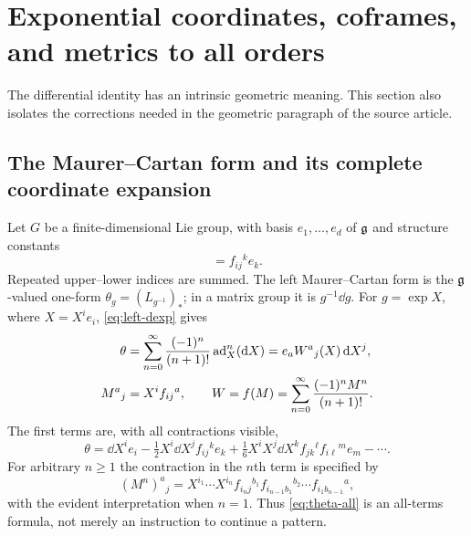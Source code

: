 \section{Exponential coordinates, coframes, and metrics to all orders}\label{sec:geometry}
The differential identity has an intrinsic geometric meaning. This section also isolates the corrections needed in the geometric paragraph of the source article.

\subsection{The Maurer--Cartan form and its complete coordinate expansion}
Let $G$ be a finite-dimensional Lie group, with basis $e_1,\ldots,e_d$ of $\mathfrak g$ and structure constants
\begin{equation}
 [e_i,e_j]=f_{ij}{}^k e_k.
\end{equation}
Repeated upper--lower indices are summed. The left Maurer--Cartan form is the $\mathfrak g$-valued one-form $\theta_g=(L_{g^{-1}})_*$; in a matrix group it is $g^{-1}\dd g$. For $g=\exp X$, where $X=X^i e_i$, \cref{eq:left-dexp} gives
\begin{align}
 \theta&=\sum_{n=0}^{\infty}\frac{(-1)^n}{(n+1)!}\operatorname{ad}_X^n(\mathrm d X)
       =e_a W^a{}_j(X)\,\mathrm d X^j,\label{eq:theta-all}\\
 M^a{}_j&=X^i f_{ij}{}^a,\qquad
 W=f(M)=\sum_{n=0}^{\infty}\frac{(-1)^nM^n}{(n+1)!}.
 \label{eq:W-all}
\end{align}
The first terms are, with all contractions visible,
\begin{equation}\label{eq:theta-first}
 \theta=\dd X^i e_i
 -\tfrac12 X^i\dd X^j f_{ij}{}^k e_k
 +\tfrac16 X^iX^j\dd X^k f_{jk}{}^\ell f_{i\ell}{}^m e_m
 -\cdots.
\end{equation}
For arbitrary $n\geq1$ the contraction in the $n$th term is specified by
\begin{equation}
 (M^n)^a{}_j=
 X^{i_1}\cdots X^{i_n}
 f_{i_nj}{}^{b_1}f_{i_{n-1}b_1}{}^{b_2}\cdots
 f_{i_1b_{n-1}}{}^a,
\end{equation}
with the evident interpretation when $n=1$. Thus \cref{eq:theta-all} is an all-terms formula, not merely an instruction to continue a pattern.

